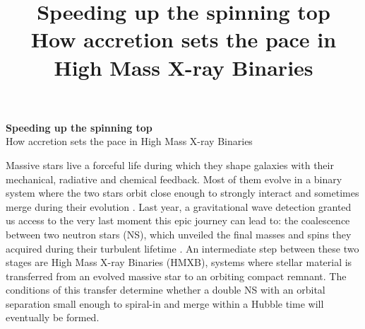 \documentclass[letterpaper,12pt,onecolumn]{article}
\title{	
\vspace*{-2.5cm}
\Large Speeding up the spinning top\\
\large How accretion sets the pace in High Mass X-ray Binaries  \\ %
}
\author{\tiny} %
\date{\tiny }%
\makeatletter
\newcommand*{\hmxb}{HMXB\@\xspace}
\newcommand*{\ns}{NS\@\xspace}
\newcommand*{\bh}{BH\@\xspace}
\makeatother
\begin{document}


\renewcommand{\headrulewidth}{1pt}
\pagestyle{fancy}
\fancyhf{}
\rfoot{\thepage / \pageref{LastPage}}

\vspace*{-1.2cm}
\begin{center}
\Large \textbf{Speeding up the spinning top}\\
\large How accretion sets the pace in High Mass X-ray Binaries 
\end{center}
\normalfont


%

Massive stars live a forceful life during which they shape galaxies with their mechanical, radiative and chemical feedback. Most of them evolve in a binary system where the two stars orbit close enough to strongly interact and sometimes merge during their evolution \citep{DeMink2012}. Last year, a gravitational wave detection granted us access to the very last moment this epic journey can lead to: the coalescence between two neutron stars (\ns), which unveiled the final masses and spins they acquired during their turbulent lifetime \citep{TheLIGOScientificCollaboration2017}. An intermediate step between these two stages are High Mass X-ray Binaries (\hmxb), systems where stellar material is transferred from an evolved massive star to an orbiting compact remnant. The conditions of this transfer determine whether a double \ns with an orbital separation small enough to spiral-in and merge within a Hubble time will eventually be formed. 
\end{document}
